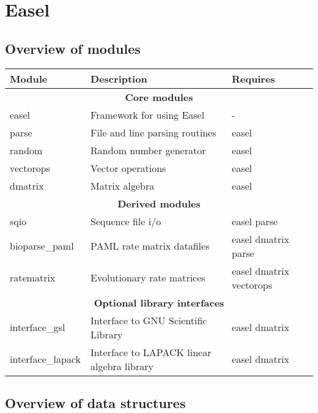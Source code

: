 \documentclass[11pt]{article}
\begin{document}




\newpage
\tableofcontents
\newpage

\section{Easel}

\subsection{Overview of modules}
\begin{tabular}{lll}\hline
\textbf{Module}            & \textbf{Description}                       & \textbf{Requires}\\\hline
  \multicolumn{3}{c}{\textbf{Core modules}}\\
easel                      & Framework for using Easel                  &  - \\
parse                      & File and line parsing routines             & easel\\
random                     & Random number generator                    & easel\\
vectorops                  & Vector operations                          & easel\\
dmatrix                    & Matrix algebra                             & easel\\ \hline
  \multicolumn{3}{c}{\textbf{Derived modules}}\\
sqio                       & Sequence file i/o                          & easel parse\\
bioparse\_paml             & PAML rate matrix datafiles                 & easel dmatrix parse \\
ratematrix                 & Evolutionary rate matrices                 & easel dmatrix vectorops\\\hline
  \multicolumn{3}{c}{\textbf{Optional library interfaces}}\\
interface\_gsl             & Interface to GNU Scientific Library        & easel dmatrix\\
interface\_lapack          & Interface to LAPACK linear algebra library & easel dmatrix \\\hline
\end{tabular}



\subsection{Overview of data structures}
\end{document}
